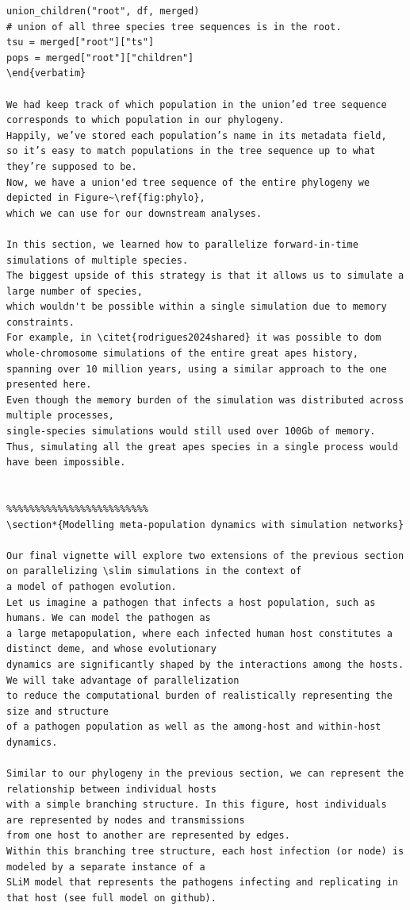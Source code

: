 \documentclass[12pt]{article}
\newcommand{\slim}[0]{\texttt{SLiM}\xspace}
\begin{document}
\begin{lstlisting}[language=slim]
union_children("root", df, merged)
# union of all three species tree sequences is in the root.
tsu = merged["root"]["ts"]
pops = merged["root"]["children"]
\end{verbatim}

We had keep track of which population in the union’ed tree sequence corresponds to which population in our phylogeny.
Happily, we’ve stored each population’s name in its metadata field, 
so it’s easy to match populations in the tree sequence up to what they’re supposed to be.
Now, we have a union'ed tree sequence of the entire phylogeny we depicted in Figure~\ref{fig:phylo},
which we can use for our downstream analyses.

In this section, we learned how to parallelize forward-in-time simulations of multiple species.
The biggest upside of this strategy is that it allows us to simulate a large number of species,
which wouldn't be possible within a single simulation due to memory constraints.
For example, in \citet{rodrigues2024shared} it was possible to dom whole-chromosome simulations of the entire great apes history,
spanning over 10 million years, using a similar approach to the one presented here.
Even though the memory burden of the simulation was distributed across multiple processes,
single-species simulations would still used over 100Gb of memory.
Thus, simulating all the great apes species in a single process would have been impossible.


%%%%%%%%%%%%%%%%%%%%%%%%%
\section*{Modelling meta-population dynamics with simulation networks}

Our final vignette will explore two extensions of the previous section on parallelizing \slim simulations in the context of
a model of pathogen evolution.
Let us imagine a pathogen that infects a host population, such as humans. We can model the pathogen as
a large metapopulation, where each infected human host constitutes a distinct deme, and whose evolutionary
dynamics are significantly shaped by the interactions among the hosts. We will take advantage of parallelization
to reduce the computational burden of realistically representing the size and structure
of a pathogen population as well as the among-host and within-host dynamics.

Similar to our phylogeny in the previous section, we can represent the relationship between individual hosts
with a simple branching structure. In this figure, host individuals are represented by nodes and transmissions
from one host to another are represented by edges.
Within this branching tree structure, each host infection (or node) is modeled by a separate instance of a
SLiM model that represents the pathogens infecting and replicating in that host (see full model on github).


\end{lstlisting}
\end{document}
